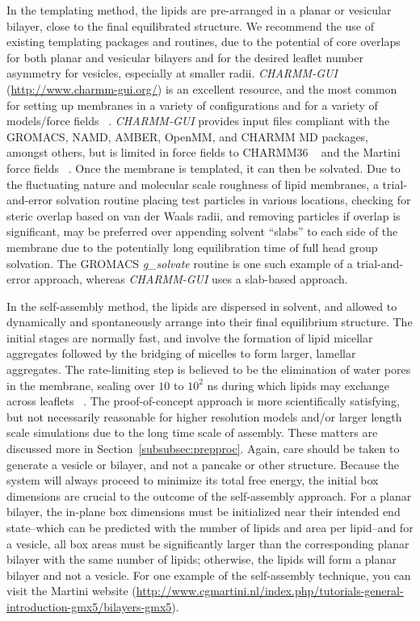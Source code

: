 \documentclass[9pt,bestpractices,pubversion]{livecoms}
\begin{document}
In the templating method, the lipids are pre-arranged in a planar or vesicular bilayer, close to the final equilibrated structure.
We recommend the use of existing templating packages and routines, due to the potential of core overlaps for both planar and vesicular bilayers and for the desired leaflet number asymmetry for vesicles, especially at smaller radii.
\textit{CHARMM-GUI} (\url{http://www.charmm-gui.org/}) is an excellent resource, and the most common for setting up membranes in a variety of configurations and for a variety of models/force fields  ~\cite{Jo2009,Cheng2013,Wu2014,Brooks2009}.
\textit{CHARMM-GUI} provides input files compliant with the GROMACS, NAMD, AMBER, OpenMM, and CHARMM MD packages, amongst others, but is limited in force fields to CHARMM36 ~\cite{Javanainen2016} and the Martini force fields ~\cite{Qi2015a}.
Once the membrane is templated, it can then be solvated.
Due to the fluctuating nature and molecular scale roughness of lipid membranes, a trial-and-error solvation routine placing test particles in various locations, checking for steric overlap based on van der Waals radii, and removing particles if overlap is significant, may be preferred over appending solvent ``slabs'' to each side of the membrane due to the potentially long equilibration time of full head group solvation.
The GROMACS \textit{g\_solvate} routine is one such example of a trial-and-error approach, whereas \textit{CHARMM-GUI} uses a slab-based approach.

In the self-assembly method, the lipids are dispersed in solvent, and allowed to dynamically and spontaneously arrange into their final equilibrium structure.
The initial stages are normally fast, and involve the formation of lipid micellar aggregates followed by the bridging of micelles to form larger, lamellar aggregates.
The rate-limiting step is believed to be the elimination of water pores in the membrane, sealing over $10$ to $10^2$ ns during which lipids may exchange across leaflets ~\cite{DeVries2004}.
The proof-of-concept approach is more scientifically satisfying, but not necessarily reasonable for higher resolution models and/or larger length scale simulations due to the long time scale of assembly.
These matters are discussed more in Section~\ref{subsubsec:prepproc}.
Again, care should be taken to generate a vesicle or bilayer, and not a pancake or other structure.
Because the system will always proceed to minimize its total free energy, the initial box dimensions are crucial to the outcome of the self-assembly approach.
For a planar bilayer, the in-plane box dimensions must be initialized near their intended end state--which can be predicted with the number of lipids and area per lipid--and for a vesicle, all box areas must be significantly larger than the corresponding planar bilayer with the same number of lipids; otherwise, the lipids will form a planar bilayer and not a vesicle.
For one example of the self-assembly technique, you can visit the Martini website (\url{http://www.cgmartini.nl/index.php/tutorials-general-introduction-gmx5/bilayers-gmx5}).
\end{document}
